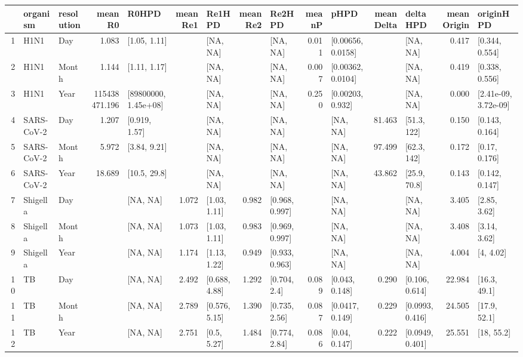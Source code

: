 \begin{table}[ht]
\centering
\begin{tabular}{rllrlrlrlrlrlrl}
  \hline
 & organism & resolution & meanR0 & R0HPD & meanRe1 & Re1HPD & meanRe2 & Re2HPD & meanP & pHPD & meanDelta & deltaHPD & meanOrigin & originHPD \\ 
  \hline
1 & H1N1 & Day & 1.083 & [1.05, 1.11] &  & [NA, NA] &  & [NA, NA] & 0.011 & [0.00656, 0.0158] &  & [NA, NA] & 0.417 & [0.344, 0.554] \\ 
  2 & H1N1 & Month & 1.144 & [1.11, 1.17] &  & [NA, NA] &  & [NA, NA] & 0.007 & [0.00362, 0.0104] &  & [NA, NA] & 0.419 & [0.338, 0.556] \\ 
  3 & H1N1 & Year & 115438471.196 & [89800000, 1.45e+08] &  & [NA, NA] &  & [NA, NA] & 0.250 & [0.00203, 0.932] &  & [NA, NA] & 0.000 & [2.41e-09, 3.72e-09] \\ 
  4 & SARS-CoV-2 & Day & 1.207 & [0.919, 1.57] &  & [NA, NA] &  & [NA, NA] &  & [NA, NA] & 81.463 & [51.3, 122] & 0.150 & [0.143, 0.164] \\ 
  5 & SARS-CoV-2 & Month & 5.972 & [3.84, 9.21] &  & [NA, NA] &  & [NA, NA] &  & [NA, NA] & 97.499 & [62.3, 142] & 0.172 & [0.17, 0.176] \\ 
  6 & SARS-CoV-2 & Year & 18.689 & [10.5, 29.8] &  & [NA, NA] &  & [NA, NA] &  & [NA, NA] & 43.862 & [25.9, 70.8] & 0.143 & [0.142, 0.147] \\ 
  7 & Shigella & Day &  & [NA, NA] & 1.072 & [1.03, 1.11] & 0.982 & [0.968, 0.997] &  & [NA, NA] &  & [NA, NA] & 3.405 & [2.85, 3.62] \\ 
  8 & Shigella & Month &  & [NA, NA] & 1.073 & [1.03, 1.11] & 0.983 & [0.969, 0.997] &  & [NA, NA] &  & [NA, NA] & 3.408 & [3.14, 3.62] \\ 
  9 & Shigella & Year &  & [NA, NA] & 1.174 & [1.13, 1.22] & 0.949 & [0.933, 0.963] &  & [NA, NA] &  & [NA, NA] & 4.004 & [4, 4.02] \\ 
  10 & TB & Day &  & [NA, NA] & 2.492 & [0.688, 4.88] & 1.292 & [0.704, 2.4] & 0.089 & [0.043, 0.148] & 0.290 & [0.106, 0.614] & 22.984 & [16.3, 49.1] \\ 
  11 & TB & Month &  & [NA, NA] & 2.789 & [0.576, 5.15] & 1.390 & [0.735, 2.56] & 0.087 & [0.0417, 0.149] & 0.229 & [0.0993, 0.416] & 24.505 & [17.9, 52.1] \\ 
  12 & TB & Year &  & [NA, NA] & 2.751 & [0.5, 5.27] & 1.484 & [0.774, 2.84] & 0.086 & [0.04, 0.147] & 0.222 & [0.0949, 0.401] & 25.551 & [18, 55.2] \\ 
   \hline
\end{tabular}
\end{table}
